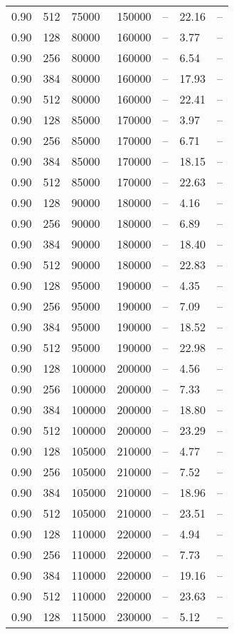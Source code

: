 \begin{tabular}{l|l|l|l|l|l|l}
0.90 & 512 &  75000 & 150000 & -- & 22.16 & --\\
0.90 & 128 &  80000 & 160000 & -- &  3.77 & --\\
0.90 & 256 &  80000 & 160000 & -- &  6.54 & --\\
0.90 & 384 &  80000 & 160000 & -- & 17.93 & --\\
0.90 & 512 &  80000 & 160000 & -- & 22.41 & --\\
0.90 & 128 &  85000 & 170000 & -- &  3.97 & --\\
0.90 & 256 &  85000 & 170000 & -- &  6.71 & --\\
0.90 & 384 &  85000 & 170000 & -- & 18.15 & --\\
0.90 & 512 &  85000 & 170000 & -- & 22.63 & --\\
0.90 & 128 &  90000 & 180000 & -- &  4.16 & --\\
0.90 & 256 &  90000 & 180000 & -- &  6.89 & --\\
0.90 & 384 &  90000 & 180000 & -- & 18.40 & --\\
0.90 & 512 &  90000 & 180000 & -- & 22.83 & --\\
0.90 & 128 &  95000 & 190000 & -- &  4.35 & --\\
0.90 & 256 &  95000 & 190000 & -- &  7.09 & --\\
0.90 & 384 &  95000 & 190000 & -- & 18.52 & --\\
0.90 & 512 &  95000 & 190000 & -- & 22.98 & --\\
0.90 & 128 & 100000 & 200000 & -- &  4.56 & --\\
0.90 & 256 & 100000 & 200000 & -- &  7.33 & --\\
0.90 & 384 & 100000 & 200000 & -- & 18.80 & --\\
0.90 & 512 & 100000 & 200000 & -- & 23.29 & --\\
0.90 & 128 & 105000 & 210000 & -- &  4.77 & --\\
0.90 & 256 & 105000 & 210000 & -- &  7.52 & --\\
0.90 & 384 & 105000 & 210000 & -- & 18.96 & --\\
0.90 & 512 & 105000 & 210000 & -- & 23.51 & --\\
0.90 & 128 & 110000 & 220000 & -- &  4.94 & --\\
0.90 & 256 & 110000 & 220000 & -- &  7.73 & --\\
0.90 & 384 & 110000 & 220000 & -- & 19.16 & --\\
0.90 & 512 & 110000 & 220000 & -- & 23.63 & --\\
0.90 & 128 & 115000 & 230000 & -- &  5.12 & --\\

\end{tabular}
